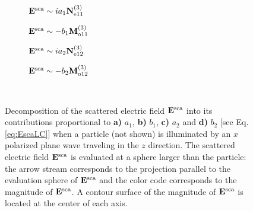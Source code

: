 \begin{figure}[h!]
	\def\svgwidth{1\textwidth} \small
  \vspace*{3.0em}
  \hspace*{0.em}
    \begin{subfigure}{.24\textwidth}\caption{\centering $\vb{E}^\text{sca} \sim  i a_1 \vb{N}^{(3)}_{\text{e}11}$}\label{fig:VSH:a1}\end{subfigure}
  	\begin{subfigure}{.24\textwidth}\caption{\centering $\vb{E}^\text{sca} \sim  - b_1 \vb{M}^{(3)}_{\text{o}11}$}\label{fig:VSH:b1}\end{subfigure}
	\begin{subfigure}{.24\textwidth}\caption{\centering $\vb{E}^\text{sca} \sim  i a_2 \vb{N}^{(3)}_{\text{e}12}$}\label{fig:VSH:a2}\end{subfigure}
	\begin{subfigure}{.24\textwidth}\caption{\centering $\vb{E}^\text{sca} \sim  - b_2 \vb{M}^{(3)}_{\text{o}12}$}\label{fig:VSH:b2}\end{subfigure}
  \vspace*{-6.em}\\
  \vspace*{-2em}
  \caption[Multipolar Contributions to the Scattered Electric Field]{ Decomposition of the  scattered electric field $\vb{E}^\text{sca}$ into its contributions  proportional to \textbf{a)} $a_1$,  \textbf{b)}  $b_1$, \textbf{c)} $a_2$ and \textbf{d)} $b_2$ [see Eq. \eqref{eq:EscaLC}] when a particle (not shown) is illuminated by an $x$ polarized plane wave traveling in the $z$ direction. The scattered electric field $\vb{E}^\text{sca}$ is evaluated at a sphere larger than the particle: the arrow stream corresponds to the projection parallel to the evaluation sphere of $\vb{E}^\text{sca}$  and the color code corresponds to the magnitude of  $\vb{E}^\text{sca}$. A contour surface of the magnitude of $\vb{E}^\text{sca}$ is located at the center of each axis. }
\label{fig:Multipoles}
\end{figure}

